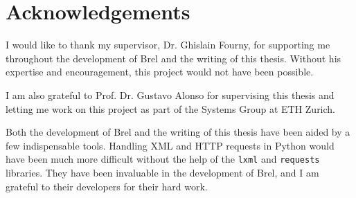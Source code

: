 \section{Acknowledgements}

I would like to thank my supervisor, Dr. Ghislain Fourny, 
for supporting me throughout the development of Brel and the writing of this thesis.
Without his expertise and encouragement, this project would not have been possible.

I am also grateful to Prof. Dr. Gustavo Alonso for supervising this thesis and letting me work on this project
as part of the Systems Group at ETH Zurich.

Both the development of Brel and the writing of this thesis have been aided by a few indispensable tools.
Handling XML and HTTP requests in Python would have been much more difficult without the help of the \texttt{lxml} and \texttt{requests} libraries.
They have been invaluable in the development of Brel, and I am grateful to their developers for their hard work.



